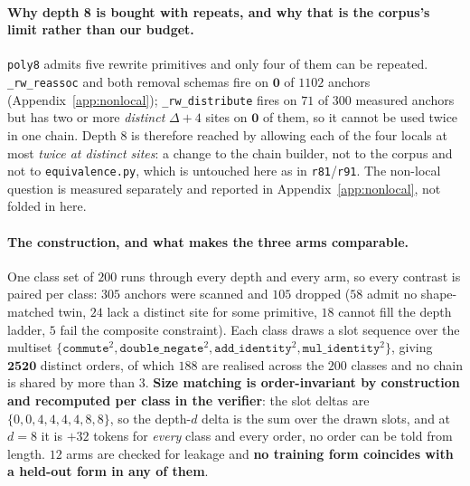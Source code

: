 \paragraph{Why depth 8 is bought with repeats, and why that is the corpus's limit rather than our budget.} \texttt{poly8} admits five rewrite primitives and only four of them can be repeated. \texttt{\_rw\_reassoc} and both removal schemas fire on $\mathbf{0}$ of $1102$ anchors (Appendix~\ref{app:nonlocal}); \texttt{\_rw\_distribute} fires on $71$ of $300$ measured anchors but has two or more \emph{distinct} $\Delta{+}4$ sites on $\mathbf{0}$ of them, so it cannot be used twice in one chain. Depth 8 is therefore reached by allowing each of the four locals at most \emph{twice at distinct sites}: a change to the chain builder, not to the corpus and not to \texttt{equivalence.py}, which is untouched here as in \texttt{r81}/\texttt{r91}. The non-local question is measured separately and reported in Appendix~\ref{app:nonlocal}, not folded in here.

\paragraph{The construction, and what makes the three arms comparable.} One class set of $200$ runs through every depth and every arm, so every contrast is paired per class: $305$ anchors were scanned and $105$ dropped ($58$ admit no shape-matched twin, $24$ lack a distinct site for some primitive, $18$ cannot fill the depth ladder, $5$ fail the composite constraint). Each class draws a slot sequence over the multiset $\{\texttt{commute}^2, \texttt{double\_negate}^2, \texttt{add\_identity}^2, \texttt{mul\_identity}^2\}$, giving $\mathbf{2520}$ distinct orders, of which $188$ are realised across the $200$ classes and no chain is shared by more than $3$. \textbf{Size matching is order-invariant by construction and recomputed per class in the verifier}: the slot deltas are $\{0,0,4,4,4,4,8,8\}$, so the depth-$d$ delta is the sum over the drawn slots, and at $d{=}8$ it is $+32$ tokens for \emph{every} class and every order, no order can be told from length. $12$ arms are checked for leakage and \textbf{no training form coincides with a held-out form in any of them}.

